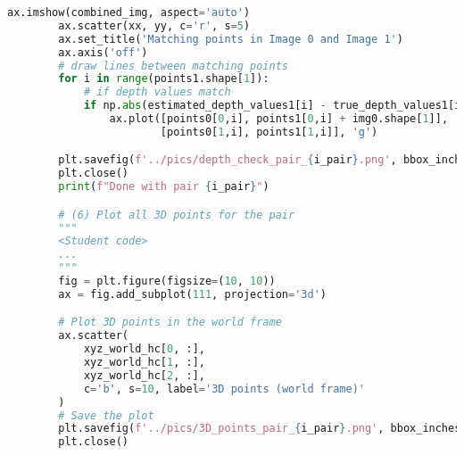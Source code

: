 \documentclass{article}
\begin{document}
\begin{lstlisting}[language=Python]
        ax.imshow(combined_img, aspect='auto')
        ax.scatter(xx, yy, c='r', s=5)
        ax.set_title('Matching points in Image 0 and Image 1')
        ax.axis('off')
        # draw lines between matching points
        for i in range(points1.shape[1]):
            # if depth values match
            if np.abs(estimated_depth_values1[i] - true_depth_values1[i]) < DEPTH_THR and true_depth_values1[i] != 0:
                ax.plot([points0[0,i], points1[0,i] + img0.shape[1]], 
                        [points0[1,i], points1[1,i]], 'g')        

        plt.savefig(f'../pics/depth_check_pair_{i_pair}.png', bbox_inches='tight', pad_inches=0)
        plt.close()
        print(f"Done with pair {i_pair}")

        # (6) Plot all 3D points for the pair
        """
        <Student code>
        ...
        """
        fig = plt.figure(figsize=(10, 10))
        ax = fig.add_subplot(111, projection='3d')

        # Plot 3D points in the world frame
        ax.scatter(
            xyz_world_hc[0, :],
            xyz_world_hc[1, :],
            xyz_world_hc[2, :],
            c='b', s=10, label='3D points (world frame)'
        )
        # Save the plot
        plt.savefig(f'../pics/3D_points_pair_{i_pair}.png', bbox_inches='tight', pad_inches=0)
        plt.close()
\end{lstlisting}
\end{document}
